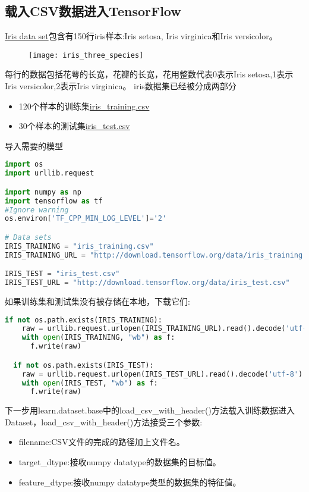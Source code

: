 \subsection{载入CSV数据进入TensorFlow}
\href{https://en.wikipedia.org/wiki/Iris_flower_data_set}{Iris data set}包含有150行iris样本:Iris setosa, Iris virginica和Iris versicolor。
\begin{figure}[H]
\texttt{[image: iris\_three\_species]}
\end{figure}
每行的数据包括花萼的长宽，花瓣的长宽，花用整数代表0表示Iris setosa,1表示 Iris versicolor,2表示Iris virginica。
iris数据集已经被分成两部分
\begin{itemize}
    \item 120个样本的训练集\href{http://download.tensorflow.org/data/iris_training.csv}{iris\_training.csv}
    \item 30个样本的测试集\href{http://download.tensorflow.org/data/iris_test.csv}{iris\_test.csv}
\end{itemize}
导入需要的模型
\begin{lstlisting}[language=Python]
import os
import urllib.request

import numpy as np
import tensorflow as tf
#Ignore warning
os.environ['TF_CPP_MIN_LOG_LEVEL']='2' 

# Data sets
IRIS_TRAINING = "iris_training.csv"
IRIS_TRAINING_URL = "http://download.tensorflow.org/data/iris_training.csv"

IRIS_TEST = "iris_test.csv"
IRIS_TEST_URL = "http://download.tensorflow.org/data/iris_test.csv"
\end{lstlisting}
如果训练集和测试集没有被存储在本地，下载它们:
\begin{lstlisting}[language=Python]
if not os.path.exists(IRIS_TRAINING):
    raw = urllib.request.urlopen(IRIS_TRAINING_URL).read().decode('utf-8')
    with open(IRIS_TRAINING, "wb") as f:
      f.write(raw)

  if not os.path.exists(IRIS_TEST):
    raw = urllib.request.urlopen(IRIS_TEST_URL).read().decode('utf-8')
    with open(IRIS_TEST, "wb") as f:
      f.write(raw)
\end{lstlisting}
下一步用learn.dataset.base中的load\_csv\_with\_header()方法载入训练数据进入Dataset，load\_csv\_with\_header()方法接受三个参数:
\begin{itemize}
    \item filename:CSV文件的完成的路径加上文件名。
    \item target\_dtype:接收numpy datatype的数据集的目标值。
    \item feature\_dtype:接收numpy datatype类型的数据集的特征值。
\end{itemize}
